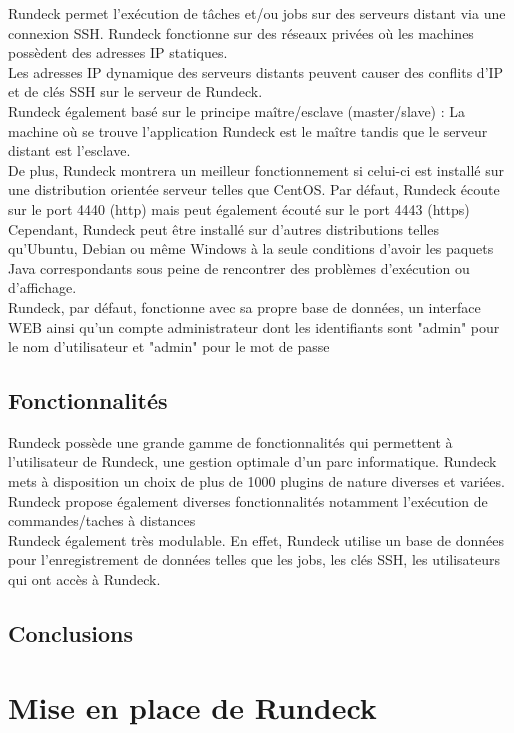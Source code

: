 \documentclass[12pt]{article}
\begin{document}
Rundeck permet l'exécution de tâches et/ou jobs sur des serveurs distant via une connexion SSH. Rundeck fonctionne sur des réseaux privées où les machines possèdent des adresses IP statiques. 
\\
Les adresses IP dynamique des serveurs distants peuvent causer des conflits d'IP et de clés SSH sur le serveur de Rundeck.
\\
Rundeck également basé sur le principe maître/esclave (master/slave) : La machine où se trouve l'application Rundeck est le maître tandis que le serveur distant est l'esclave. 
\\
De plus, Rundeck montrera un meilleur fonctionnement si celui-ci est installé sur une distribution orientée serveur telles que CentOS. Par défaut, Rundeck écoute sur le port 4440 (http) mais peut également écouté sur le port 4443 (https)
\\
Cependant, Rundeck peut être installé sur d'autres distributions telles qu'Ubuntu, Debian ou même Windows à la seule conditions d'avoir les paquets Java correspondants sous peine de rencontrer des problèmes d'exécution ou d'affichage.
\\
Rundeck, par défaut, fonctionne avec sa propre base de données, un interface WEB ainsi qu'un compte administrateur dont les identifiants sont "admin" pour le nom d'utilisateur et "admin" pour le mot de passe

\subsection{Fonctionnalités}

Rundeck possède une grande gamme de fonctionnalités qui permettent à l'utilisateur de Rundeck, une gestion optimale d'un parc informatique. Rundeck mets à disposition un choix de plus de 1000 plugins de nature diverses et variées. 
\\
Rundeck propose également diverses fonctionnalités notamment l'exécution de commandes/taches à distances
\\
Rundeck également très modulable. En effet, Rundeck utilise un base de données pour l'enregistrement de données telles que les jobs, les clés SSH, les utilisateurs qui ont accès à Rundeck.

\subsection{Conclusions}

\section{Mise en place de Rundeck}
\end{document}

